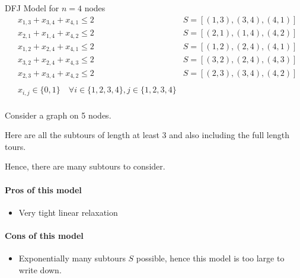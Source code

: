 \begin{example}{DFJ Model for $n=4$ nodes}{}
\begin{align*}
 & x_{1,3} + x_{3,4} + x_{4,1} \leq 2& S = [(1,3),(3,4), (4,1)]\\
 & x_{2,1} + x_{1,4} + x_{4,2} \leq 2& S = [(2,1), (1,4), (4,2)]\\
 & x_{1,2} + x_{2,4} + x_{4,1} \leq 2& S = [(1,2), (2,4), (4,1)]\\
 & x_{3,2} + x_{2,4} + x_{4,3} \leq 2& S = [(3,2), (2,4), (4,3)]\\
 & x_{2,3} + x_{3,4} + x_{4,2} \leq 2& S = [(2,3), (3,4), (4,2)]\\
 \\
 & x_{i,j} \in \{0,1\} \quad\forall i \in \{1,2,3,4\}, j \in \{1,2,3,4\}\\
\end{align*}




\end{example}


\begin{example}{}{}

Consider a graph on 5 nodes.


Here are all the subtours of length at least 3 and also including the full length tours.


Hence, there are many subtours to consider.
\end{example}


\paragraph{Pros of this model}
\begin{itemize}
\item Very tight linear relaxation
\end{itemize}
\paragraph{Cons of this model}
\begin{itemize}
\item Exponentially many subtours $S$ possible, hence this model is too large to write down.
\end{itemize}

